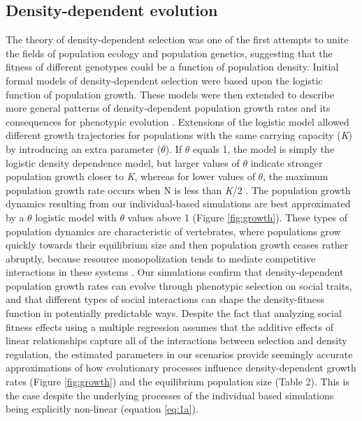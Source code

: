 \documentclass{article}
\begin{document}
\subsection{Density-dependent evolution}
The theory of density-dependent selection was one of the first attempts to unite the fields of population ecology and population genetics, suggesting that the fitness of different genotypes could be a function of population density. Initial formal models of density-dependent selection \citep{Anderson1971, Charlesworth1971} were based upon the logistic function of population growth. These models were then extended to describe more general patterns of density-dependent population growth rates \citep{Gilpin1973a} and its consequences for phenotypic evolution \citep{Gilpin1976}. Extensions of the logistic model allowed different growth trajectories for populations with the same carrying capacity (\textit{K}) by introducing an extra parameter ($\theta$). If $\theta$ equals 1, the model is simply the logistic density dependence model, but larger values of $\theta$ indicate stronger population growth closer to \textit{K}, whereas for lower values of $\theta$, the maximum population growth rate occurs when N is less than \textit{K}/2 \citep{Lande2003}. The population growth dynamics resulting from our individual-based simulations are best approximated by a $\theta$ logistic model with $\theta$ values above 1 (Figure \ref{fig:growth}). These types of population dynamics are characteristic of vertebrates, where populations grow quickly towards their equilibrium size and then population growth ceases rather abruptly, because resource monopolization tends to mediate competitive interactions in these systems \citep{Gilpin1973a}. Our simulations confirm that density-dependent population growth rates can evolve through phenotypic selection on social traits, and that different types of social interactions can shape the density-fitness function in potentially predictable ways. Despite the fact that analyzing social fitness effects using a multiple regression assumes that the additive effects of linear relationships capture all of the interactions between selection and density regulation, the estimated parameters in our scenarios provide seemingly accurate approximations of how evolutionary processes influence density-dependent growth rates (Figure \ref{fig:growth}) and the equilibrium population size (Table 2). This is the case despite the underlying processes of the individual based simulations being explicitly non-linear (equation \ref{eq:1a}). 
\end{document}
